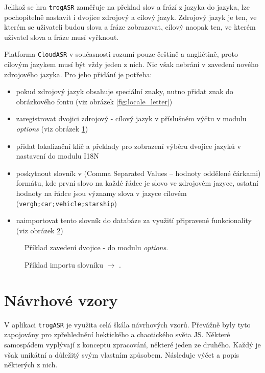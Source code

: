 Jelikož se hra \verb|trogASR| zaměřuje na překlad slov a frází z jazyka do jazyka, lze pochopitelně nastavit i dvojice zdrojový a cílový jazyk. Zdrojový jazyk je ten, ve kterém se uživateli budou slova a fráze zobrazovat, cílový naopak ten, ve kterém uživatel slova a fráze musí vyřknout.

Platforma \verb|CloudASR| v současnosti rozumí pouze češtině a angličtině, proto cílovým jazykem musí být vždy jeden z nich. Nic však nebrání v zavedení nového zdrojového jazyka. Pro jeho přidání je potřeba:

\begin{itemize}
\item pokud zdrojový jazyk obsahuje speciální znaky, nutno přidat znak do obrázkového fontu (viz obrázek \ref{fig:locale_letter})
\item zaregistrovat dvojici zdrojový - cílový jazyk v příslušném výčtu v modulu {\sl options} (viz obrázek \ref{fig:locale_options})
\item přidat lokalizační klíč a překlady pro zobrazení výběru dvojice jazyků v nastavení do modulu I18N
\item poskytnout slovník v  (Comma Separated Values -- hodnoty oddělené čárkami) formátu, kde první slovo na každé řádce je slovo ve zdrojovém jazyce, ostatní hodnoty na řádce jsou významy slova v jazyce cílovém (\verb|vergh;car;vehicle;starship|)
\item naimportovat tento slovník do databáze za využití připravené funkcionality (viz obrázek \ref{fig:locale_import})
\end{itemize}

\begin{figure}[h]
	
	\caption{Příklad zavedení dvojice  -  do modulu {\sl options}.}
	\label{fig:locale_options}
\end{figure}

\begin{figure}[h]
	
	\caption{Příklad importu slovníku  $\rightarrow$ .}
	\label{fig:locale_import}
\end{figure}

\section{Návrhové vzory}

V aplikaci \verb|trogASR| je využita celá škála návrhových vzorů. Převážně byly tyto zapojovány pro zpřehlednění hektického a chaotického světa JS. Některé samospádem vyplývají z konceptu zpracování, některé jeden ze druhého. Každý je však unikátní a důležitý svým vlastním způsobem. Následuje výčet a popis některých z nich.

